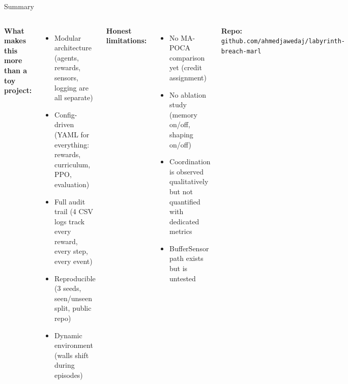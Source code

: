 \documentclass[aspectratio=169,11pt]{beamer}
\begin{document}
\begin{frame}{Summary}
\begin{columns}[T]
\textbf{What makes this more than a toy project:}
\begin{itemize}
\item Modular architecture (agents, rewards, sensors, logging are all separate)
\item Config-driven (YAML for everything: rewards, curriculum, PPO, evaluation)
\item Full audit trail (4 CSV logs track every reward, every step, every event)
\item Reproducible (3 seeds, seen/unseen split, public repo)
\item Dynamic environment (walls shift during episodes)
\end{itemize}

\textbf{Honest limitations:}
\begin{itemize}
\item No MA-POCA comparison yet (credit assignment)
\item No ablation study (memory on/off, shaping on/off)
\item Coordination is observed qualitatively but not quantified with dedicated metrics
\item BufferSensor path exists but is untested
\end{itemize}

\vspace{6pt}
\textbf{Repo:} \texttt{github.com/ahmedjawedaj/labyrinth-breach-marl}
\end{columns}
\end{frame}
\end{document}
